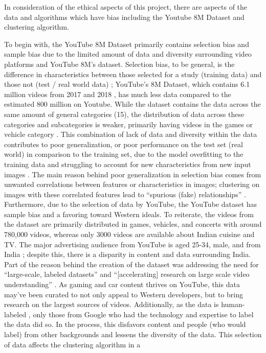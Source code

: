 \documentclass[10pt,twocolumn]{article}
\begin{document}

In consideration of the ethical aspects of this project, there are aspects of the data and algorithms which have bias including the Youtube 8M Dataset and clustering algorithm.


To begin with, the YouTube 8M Dataset primarily contains selection bias and sample bias due to the limited amount of data and diversity surrounding video platforms and YouTube 8M’s dataset. Selection bias, to be general, is the difference in characteristics between those selected for a study (training data) and those not (test / real world data) \cite{Yu2020}; YouTube’s 8M Dataset, which contains 6.1 million videos from 2017 and 2018 \cite{googleYT8M}, has much less data compared to the estimated 800 million on Youtube. While the dataset contains the data across the same amount of general categories (15), the distribution of data across these categories and subcategories is weaker, primarily having videos in the games or vehicle category \cite{googleYT8M}. This combination of lack of data and diversity within the data contributes to poor generalization, or poor performance on the test set (real world) in comparison to the training set, due to the model overfitting to the training data and struggling to account for new characteristics from new input images \cite{Yu2020}. The main reason behind poor generalization in selection bias comes from unwanted correlations between features or characteristics in images; clustering on images with these correlated features lead to “spurious (fake) relationships” \cite{Yu2020}. Furthermore, due to the selection of data by YouTube, the YouTube dataset has sample bias and a favoring toward Western ideals. To reiterate, the videos from the dataset are primarily distributed in games, vehicles, and concerts with around 780,000 videos, whereas only 3000 videos are available about Indian cuisine and TV. The major advertising audience from YouTube is aged 25-34, male, and from India \cite{HootSuite2022}; despite this, there is a disparity in content and data surrounding India. Part of the reason behind the creation of the dataset was addressing the need for “large-scale, labeled datasets” and “[accelerating] research on large scale video understanding” \cite{Warrick2020}. As gaming and car content thrives on YouTube, this data may’ve been curated to not only appeal to Western developers, but to bring research on the largest sources of videos. Additionally, as the data is human-labeled \cite{googleYT8M}, only those from Google who had the technology and expertise to label the data did so. In the process, this disfavors content and people (who would label) from other backgrounds and lessens the diversity of the data. This selection of data affects the clustering algorithm in a 
\end{document}

